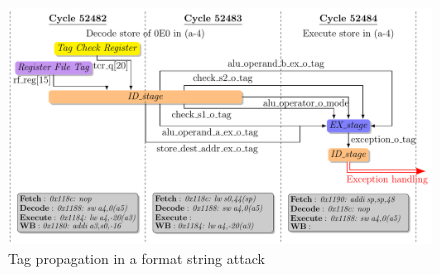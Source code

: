  \begin{figure}[ht]
    \centering
    \includegraphics[width=\linewidth]{c3_vulnerabilities_assessment/img/wuftpd/full_ftpd_short.pdf}
    \caption{Tag propagation in a format string attack}
    \label{fig:study_mem_overwriting_tag_propagation}
 \end{figure}

